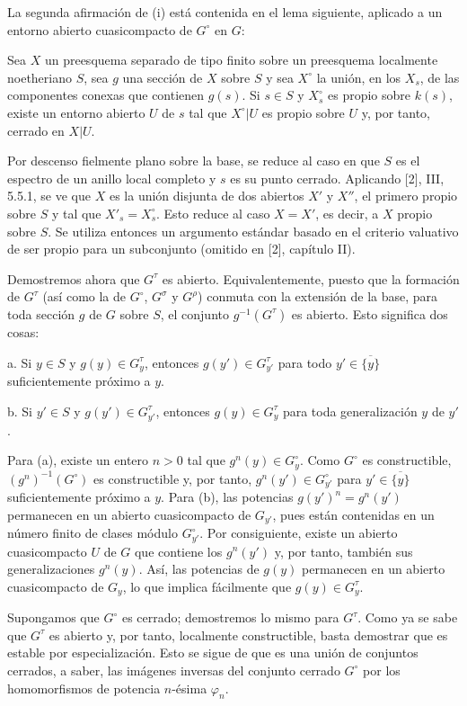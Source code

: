 La segunda afirmación de (i) está contenida en el lema siguiente, aplicado a
un entorno abierto cuasicompacto de $G^\circ$ en $G$:

 Sea $X$ un preesquema separado de tipo finito sobre un
preesquema localmente noetheriano $S$, sea $g$ una sección de $X$ sobre $S$ y
sea $X^\circ$ la unión, en los $X_s$, de las componentes conexas que contienen
$g(s)$. Si $s\in S$ y $X_s^\circ$ es propio sobre $k(s)$, existe un entorno
abierto $U$ de $s$ tal que $X^\circ|U$ es propio sobre $U$ y, por tanto,
cerrado en $X|U$.

Por descenso fielmente plano sobre la base, se reduce al caso en que $S$ es el
espectro de un anillo local completo y $s$ es su punto cerrado. Aplicando [2],
III, 5.5.1, se ve que $X$ es la unión disjunta de dos abiertos $X'$ y $X''$, el
primero propio sobre $S$ y tal que $X'_s=X_s^\circ$. Esto reduce al caso
$X=X'$, es decir, a $X$ propio sobre $S$. Se utiliza entonces un argumento
estándar basado en el criterio valuativo de ser propio para un subconjunto
(omitido en [2], capítulo II).

Demostremos ahora que $G^\tau$ es abierto. Equivalentemente, puesto que la
formación de $G^\tau$ (así como la de $G^\circ$, $G^\sigma$ y $G^\rho$) conmuta
con la extensión de la base, para toda sección $g$ de $G$ sobre $S$, el
conjunto $g^{-1}(G^\tau)$ es abierto. Esto significa dos cosas:

\medskip
\noindent a. Si $y\in S$ y $g(y)\in G_y^\tau$, entonces
$g(y')\in G_{y'}^\tau$ para todo $y'\in\overline{\{y\}}$ suficientemente
próximo a $y$.

\medskip
\noindent b. Si $y'\in S$ y $g(y')\in G_{y'}^\tau$, entonces
$g(y)\in G_y^\tau$ para toda generalización $y$ de $y'$.

Para (a), existe un entero $n>0$ tal que $g^n(y)\in G_y^\circ$. Como
$G^\circ$ es constructible, $(g^n)^{-1}(G^\circ)$ es constructible y, por
tanto, $g^n(y')\in G_{y'}^\circ$ para
$y'\in\overline{\{y\}}$ suficientemente próximo a $y$. Para (b), las
potencias $g(y')^n=g^n(y')$ permanecen en un abierto cuasicompacto de
$G_{y'}$, pues están contenidas en un número finito de clases módulo
$G_{y'}^\circ$. Por consiguiente, existe un abierto cuasicompacto $U$ de $G$
que contiene los $g^n(y')$ y, por tanto, también sus generalizaciones
$g^n(y)$. Así, las potencias de $g(y)$ permanecen en un abierto cuasicompacto
de $G_y$, lo que implica fácilmente que $g(y)\in G_y^\tau$.

Supongamos que $G^\circ$ es cerrado; demostremos lo mismo para $G^\tau$. Como
ya se sabe que $G^\tau$ es abierto y, por tanto, localmente constructible,
basta demostrar que es estable por especialización. Esto se sigue de que es
una unión de conjuntos cerrados, a saber, las imágenes inversas del conjunto
cerrado $G^\circ$ por los homomorfismos de potencia $n$-ésima $\varphi_n$.

